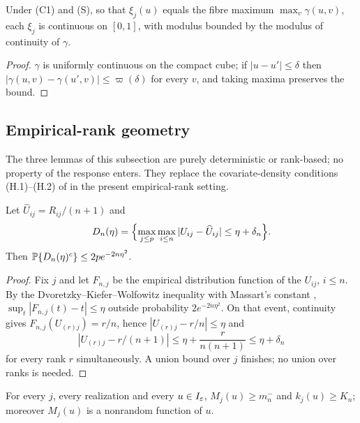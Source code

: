\begin{lemma}\label{lem:app-envelope-cont}
Under (C1) and (S), so that $\xi_j(u)$ equals the fibre maximum
$\max_v\gamma(u,v)$, each $\xi_j$ is continuous on $[0,1]$, with
modulus bounded by the modulus of continuity of $\gamma$.
\end{lemma}

\begin{proof}
$\gamma$ is uniformly continuous on the compact cube; if
$|u-u'|\le\delta$ then $|\gamma(u,v)-\gamma(u',v)|\le\varpi(\delta)$ for
every $v$, and taking maxima preserves the bound.
\end{proof}

\subsection{Empirical-rank geometry}\label{app:rankgeom}

The three lemmas of this subsection are purely deterministic or
rank-based; no property of the response enters.  They replace the
covariate-density conditions (H.1)--(H.2) of
\citet{gardesPodgorny2025} in the present empirical-rank setting.

\begin{lemma}\label{lem:app-dkw}
Let $\widehat U_{ij}=R_{ij}/(n+1)$ and
\[
 D_n(\eta)=\Bigl\{\max_{j\le p}\max_{i\le n}
 |U_{ij}-\widehat U_{ij}|\le\eta+\delta_n\Bigr\}.
\]
Then $\mathbb P\{D_n(\eta)^c\}\le2pe^{-2n\eta^2}$.
\end{lemma}

\begin{proof}
Fix $j$ and let $F_{n,j}$ be the empirical distribution function of the
$U_{ij}$, $i\le n$.  By the Dvoretzky--Kiefer--Wolfowitz inequality with
Massart's constant \citep{massart1990},
$\sup_t|F_{n,j}(t)-t|\le\eta$ outside probability
$2e^{-2n\eta^2}$.  On that event, continuity gives
$F_{n,j}(U_{(r)j})=r/n$, hence $|U_{(r)j}-r/n|\le\eta$ and
\[
 |U_{(r)j}-r/(n+1)|\le\eta+\frac{r}{n(n+1)}\le\eta+\delta_n
\]
for every rank $r$ simultaneously.  A union bound over $j$ finishes; no
union over ranks is needed.
\end{proof}

\begin{lemma}\label{lem:app-counts}
For every $j$, every realization and every $u\in I_\varepsilon$,
$M_j(u)\ge m_n^-$ and $k_j(u)\ge K_n$; moreover $M_j(u)$ is a nonrandom
function of $u$.
\end{lemma}

